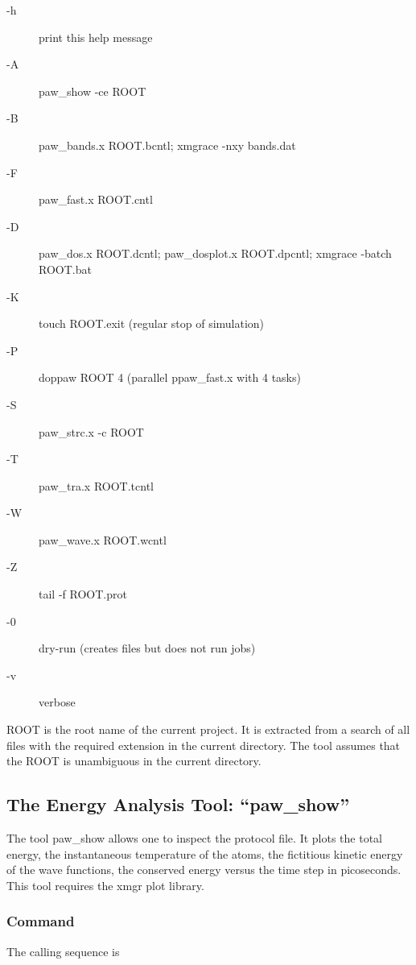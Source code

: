 \documentclass[final,12pt,makeidx,DIV=calc]{article}
\begin{document}
{{{{{{\begin{description}
\item[-h] print this help message
\item[-A] paw\_show -ce ROOT
\item[-B] paw\_bands.x ROOT.bcntl; xmgrace -nxy bands.dat
\item[-F] paw\_fast.x ROOT.cntl 
\item[-D] paw\_dos.x ROOT.dcntl; paw\_dosplot.x ROOT.dpcntl; 
  xmgrace -batch ROOT.bat
\item[-K] touch ROOT.exit (regular stop of simulation)
\item[-P] doppaw ROOT 4 (parallel ppaw\_fast.x with 4 tasks)
\item[-S] paw\_strc.x -c ROOT
\item[-T] paw\_tra.x ROOT.tcntl
\item[-W] paw\_wave.x ROOT.wcntl
\item[-Z] tail -f ROOT.prot
\item[-0] dry-run (creates files but does not run jobs)
\item[-v] verbose
\end{description}

ROOT is the root name of the current project. It is extracted from a
search of all files with the required extension in the current
directory.  The tool assumes that the ROOT is unambiguous in the
current directory.

\subsection{The Energy Analysis Tool: ``paw\_show''}
\label{sec:pawshow}
The tool paw\_show allows one to inspect the protocol file. It plots the
total energy, the instantaneous temperature of the atoms, the
fictitious kinetic energy of the wave functions, the conserved energy
versus the time step in picoseconds. This tool requires the xmgr plot
library\cite{xmgrace}.

\subsubsection{Command}

The calling sequence is

}}}}}}
\end{document}
